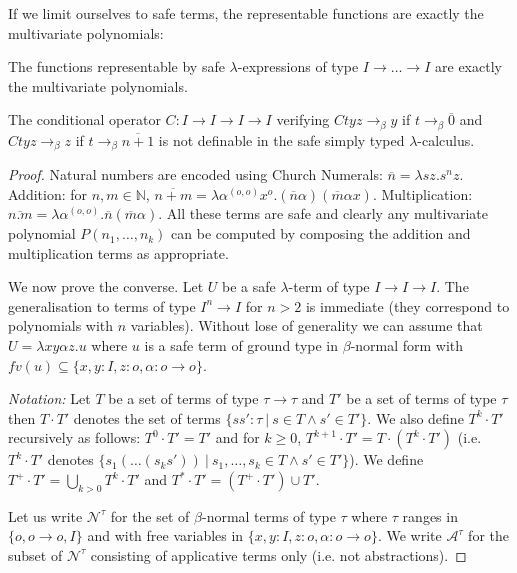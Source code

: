 \documentclass{llncs}
\newcommand{\encode}[1]{\overline{#1}}
\newcommand\union{\cup}
\newcommand\Union{\bigcup}
\newcommand\nat{\mathbb{N}}
\begin{document}
If we limit ourselves to safe terms, the representable functions are exactly the multivariate polynomials:
\begin{theorem}
\label{thm:polychar}
The functions representable by safe $\lambda$-expressions of type $I\rightarrow \ldots \rightarrow I$ are exactly the multivariate polynomials.
\end{theorem}

\begin{corollary}
The conditional operator $C:I\rightarrow I\rightarrow I \rightarrow I$ verifying  $C t y z \rightarrow_\beta y$  if $t \rightarrow_\beta \encode{0}$ and $C t y z \rightarrow_\beta z$ if $t \rightarrow_\beta \encode{n+1}$ is not definable in the safe simply typed $\lambda$-calculus.
\end{corollary}
\begin{proof}
Natural numbers are encoded using Church Numerals: $\encode{n} = \lambda s z. s^n z$. 
Addition: for $n,m \in \nat$, $\encode{n+m} = \lambda \alpha^{(o,o)} x^o . (\encode{n} \alpha) (\encode{m} \alpha x)$. Multiplication: $\encode{n . m} = \lambda \alpha^{(o,o)} . \encode{n} (\encode{m} \alpha)$.
All these terms are safe and clearly any multivariate polynomial $P(n_1, \ldots, n_k)$ can be computed by composing the addition and multiplication terms as appropriate.

We now prove the converse. Let $U$ be a safe $\lambda$-term of type $I\rightarrow I\rightarrow I$. 
The generalisation to terms of type $I^n \rightarrow I$ for $n>2$ is immediate (they correspond to polynomials with $n$ variables). Without lose of generality we can assume that $U = \lambda x y \alpha z. u$ where $u$ is a safe term of ground type in $\beta$-normal form with $fv(u) \subseteq \{ x, y : I, z :o, \alpha : o\rightarrow o \}$.

\emph{Notation:} Let $T$ be a set of terms of type $\tau \rightarrow \tau$ and $T'$ be a set of terms of type $\tau$ then $T \cdot T'$ denotes the set of terms $\{ s s' : \tau \ | \ s \in T \wedge s' \in T' \}$. We also define 
$T^k \cdot T'$ recursively as follows:  $T^0 \cdot T' = T'$ and
for $k\geq 0$, $T^{k+1} \cdot T' = T \cdot (T^k \cdot T')$ (i.e. $T^k \cdot T'$ denotes $\{ s_1( \ldots (s_k s'))  \ | \ s_1, \ldots, s_k \in T \wedge s' \in T' \}$). We define $T^+\cdot T' = \Union_{k > 0} T^k \cdot T'$ and 
$T^*\cdot T' = (T^+\cdot T') \union T'$.

Let us write $\mathcal{N}^\tau$ for the set of $\beta$-normal terms of type $\tau$ where $\tau$ ranges in $\{ o, o\rightarrow o, I  \}$ and with free variables in $\{ x,y:I, z:o, \alpha:o\rightarrow o\}$. We write $\mathcal{A}^\tau$ for the subset of $\mathcal{N}^\tau$ consisting of applicative terms only (i.e. not abstractions).


\end{proof}
\end{document}
